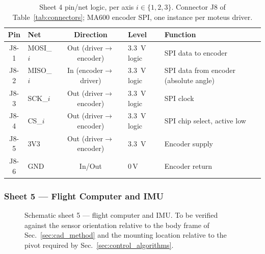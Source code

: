 \begin{table}[htbp]
\centering
\caption[Sheet 4 pin/net logic]{Sheet 4 pin/net logic, per axis $i\in\{1,2,3\}$. Connector J8 of
Table~\ref{tab:connectors}; MA600 encoder SPI, one instance per moteus driver.}
\label{tab:pins_encoders}
\small
\setlength{\tabcolsep}{4pt}
\begin{tabular}{c L{2.6cm} c L{2.4cm} L{5.4cm}}
\toprule
Pin & Net & Direction & Level & Function \\
\midrule
J8-1 & MOSI\_$i$ & Out (driver$\to$encoder) & \qty{3.3}{\volt} logic & SPI data to encoder \\
J8-2 & MISO\_$i$ & In (encoder$\to$driver) & \qty{3.3}{\volt} logic & SPI data from encoder (absolute angle) \\
J8-3 & SCK\_$i$ & Out (driver$\to$encoder) & \qty{3.3}{\volt} logic & SPI clock \\
J8-4 & CS\_$i$ & Out (driver$\to$encoder) & \qty{3.3}{\volt} logic & SPI chip select, active low \\
J8-5 & 3V3 & Out (driver$\to$encoder) & \qty{3.3}{\volt} & Encoder supply \\
J8-6 & GND & In/Out & 0\,V & Encoder return \\
\bottomrule
\end{tabular}
\end{table}

\subsubsection{Sheet 5 --- Flight Computer and IMU}
\begin{figure}[htbp]
\centering
{}
\caption[Schematic sheet 5: flight computer and IMU]{Schematic sheet 5 --- flight computer and IMU. To be verified against
the sensor orientation relative to the body frame of
Sec.~\ref{sec:cad_method} and the mounting location relative to the pivot
required by Sec.~\ref{sec:control_algorithms}.}
\label{fig:sch_fc_imu}
\end{figure}

